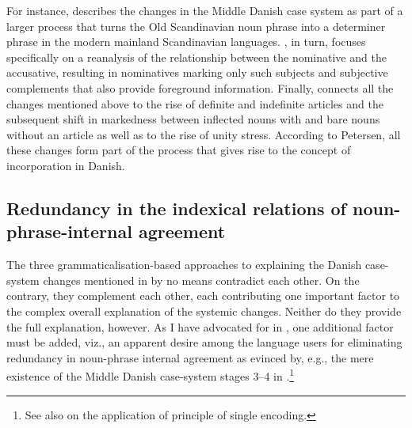 \documentclass[output=paper]{langsci/langscibook}
\begin{document}
For instance, \citet[13--22]{Heltoft2010} describes the changes in the Middle Danish case system as part of a larger process that turns the Old Scandinavian noun phrase into a determiner phrase in the modern mainland Scandinavian languages. \citet[201–232, 283–311]{Jensen2011}, in turn, focuses specifically on a reanalysis of the relationship between the nominative and the accusative, resulting in nominatives marking only such subjects and subjective complements that also provide foreground information. Finally, \citet[e.g. 63–89]{Petersen2018} connects all the changes mentioned above to the rise of definite and indefinite articles and the subsequent shift in markedness between inflected nouns with and bare nouns without an article as well as to the rise of unity stress. According to Petersen, all these changes form part of the process that gives rise to the concept of incorporation in Danish.

\subsection{Redundancy in the indexical relations of noun-phrase-internal agreement} \label{hansen:3.4}

The three grammaticalisation-based approaches to explaining the Danish case-system changes mentioned in  by no means contradict each other. On the contrary, they complement each other, each contributing one important factor to the complex overall explanation of the systemic changes. Neither do they provide the full explanation, however. As I have advocated for in \citet{Hansen2021}, one additional factor must be added, viz., an apparent desire among the language users for eliminating redundancy in noun-phrase internal agreement as evinced by, e.g., the mere existence of the Middle Danish case-system stages 3–4 in .\footnote{See also  on the application of  principle of single encoding.}
\end{document}
